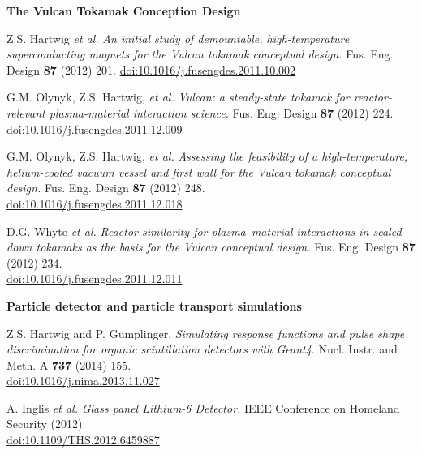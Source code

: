 \documentclass[10pt]{article}
\begin{document}
\vspace{0.5cm}

\textbf{The Vulcan Tokamak Conception Design}
\begin{innerlist}
\item Z.S. Hartwig \textit{et al.} \textit{An initial study of
  demountable, high-temperature superconducting magnets for the Vulcan
  tokamak conceptual design.} Fus. Eng. Design \textbf{87} (2012) 201.
  \href{http://dx.doi.org/10.1016/j.fusengdes.2011.10.002}{doi:10.1016/j.fusengdes.2011.10.002}
  \vspace{0.2cm}

\item G.M. Olynyk, Z.S. Hartwig, \textit{et al.} \textit{Vulcan: a
  steady-state tokamak for reactor-relevant plasma-material
  interaction science.} Fus. Eng. Design \textbf{87} (2012) 224.
  \href{http://dx.doi.org/10.1016/j.fusengdes.2011.12.009}{doi:10.1016/j.fusengdes.2011.12.009}
  \vspace{0.2cm}

\item G.M. Olynyk, Z.S. Hartwig, \textit{et al.} \textit{Assessing the
  feasibility of a high-temperature, helium-cooled vacuum vessel and
  first wall for the Vulcan tokamak conceptual design.} Fus. Eng. Design \textbf{87} (2012) 248.\\
  \href{http://dx.doi.org/10.1016/j.fusengdes.2011.12.018}{doi:10.1016/j.fusengdes.2011.12.018}
  \vspace{0.2cm}

\item D.G. Whyte \textit{et al.} \textit{Reactor similarity for
  plasma--material interactions in scaled-down tokamaks as the basis
  for the Vulcan conceptual design.} Fus. Eng. Design \textbf{87} (2012) 234.\\
  \href{http://dx.doi.org/10.1016/j.fusengdes.2011.12.011}{doi:10.1016/j.fusengdes.2011.12.011}
\end{innerlist}

\vspace{0.5cm}

\textbf{Particle detector and particle transport simulations}
\begin{innerlist}
\item Z.S. Hartwig and P. Gumplinger. \textit{Simulating response functions
  and pulse shape discrimination for organic scintillation detectors
  with Geant4}. Nucl. Instr. and Meth. A \textbf{737} (2014) 155.\\
  \href{http://dx.doi.org/10.1016/j.nima.2013.11.027}{doi:10.1016/j.nima.2013.11.027}
  \vspace{0.2cm}

\item A. Inglis \textit{et al.} \textit{Glass panel Lithium-6 Detector.}
IEEE Conference on Homeland Security (2012).\\
\href{http://dx.doi.org/10.1109/THS.2012.6459887}{doi:10.1109/THS.2012.6459887}
\end{innerlist}
\end{document}
